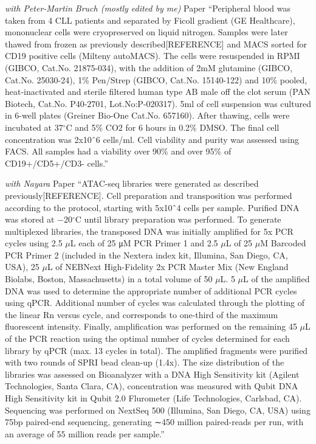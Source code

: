 \documentclass[11pt, a4paper, twosided]{book}
\begin{document}
\emph{with Peter-Martin Bruch (mostly edited by me)} Paper
``Peripheral blood was taken from 4 CLL patients and separated by Ficoll gradient (GE Healthcare), mononuclear cells were cryopreserved on liquid nitrogen. Samples were later thawed from frozen as previously described{[}REFERENCE{]} and MACS sorted for CD19 positive cells (Milteny autoMACS). The cells were resuspended in RPMI (GIBCO, Cat.No. 21875-034), with the addition of 2mM glutamine (GIBCO, Cat.No. 25030-24), 1\% Pen/Strep (GIBCO, Cat.No. 15140-122) and 10\% pooled, heat-inactivated and sterile filtered human type AB male off the clot serum (PAN Biotech, Cat.No. P40-2701, Lot.No:P-020317). 5ml of cell suspension was cultured in 6-well plates (Greiner Bio-One Cat.No. 657160). After thawing, cells were incubated at 37\(^\circ\)C and 5\% CO2 for 6 hours in 0.2\% DMSO. The final cell concentration was 2x10ˆ6 cells/ml. Cell viability and purity was assessed using FACS. All samples had a viability over 90\% and over 95\% of CD19+/CD5+/CD3- cells.''

\emph{with Nayara} Paper
``ATAC-seq libraries were generated as described previously{[}REFERENCE{]}. Cell preparation and transposition was performed according to the protocol, starting with 5x10ˆ4 cells per sample. Purified DNA was stored at −20\(^\circ\)C until library preparation was performed. To generate multiplexed libraries, the transposed DNA was initially amplified for 5x PCR cycles using 2.5 \(\mu\)L each of 25 μM PCR Primer 1 and 2.5 \(\mu\)L of 25 \(\mu\)M Barcoded PCR Primer 2 (included in the Nextera index kit, Illumina, San Diego, CA, USA), 25 \(\mu\)L of NEBNext High-Fidelity 2x PCR Master Mix (New England Biolabs, Boston, Massachusetts) in a total volume of 50 \(\mu\)L. 5 \(\mu\)L of the amplified DNA was used to determine the appropriate number of additional PCR cycles using qPCR. Additional number of cycles was calculated through the plotting of the linear Rn versus cycle, and corresponds to one-third of the maximum fluorescent intensity. Finally, amplification was performed on the remaining 45 \(\mu\)L of the PCR reaction using the optimal number of cycles determined for each library by qPCR (max. 13 cycles in total). The amplified fragments were purified with two rounds of SPRI bead clean-up (1.4x). The size distribution of the libraries was assessed on Bioanalyzer with a DNA High Sensitivity kit (Agilent Technologies, Santa Clara, CA), concentration was measured with Qubit DNA High Sensitivity kit in Qubit 2.0 Flurometer (Life Technologies, Carlsbad, CA). Sequencing was performed on NextSeq 500 (Illumina, San Diego, CA, USA) using 75bp paired-end sequencing, generating ∼450 million paired-reads per run, with an average of 55 million reads per sample.''
\end{document}
